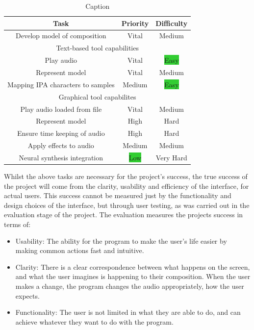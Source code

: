 \documentclass[12pt,a4paper,twoside,openright]{report}
\newcommand{\vital}{\colorbox{BrickRed}{Vital}}
\newcommand{\veryhard}{\colorbox{BrickRed}{Very Hard}}
\newcommand{\hard}{\colorbox{RedOrange}{Hard}}
\newcommand{\high}{\colorbox{RedOrange}{High}}
\newcommand{\medium}{\colorbox{Dandelion}{Medium}}
\newcommand{\low}{\colorbox{LimeGreen}{Low}}
\newcommand{\easy}{\colorbox{LimeGreen}{Easy}}
\begin{document}
\begin{table}[h]
    \centering
    \begin{tabular}{|c|c|c|}
        \hline
         Task & Priority & Difficulty \\
         \hline
         Develop model of composition & \vital & \medium \\
         \hline
         \multicolumn{3}{|c|}{Text-based tool capabilities} \\
         \hline
         Play audio & \vital & \easy \\
         Represent model & \vital & \medium \\
         Mapping IPA characters to samples & \medium & \easy \\
         \hline
         \multicolumn{3}{|c|}{Graphical tool capabilites} \\
         \hline
         Play audio loaded from file & \vital & \medium \\
         Represent model & \high & \hard \\
         Ensure time keeping of audio & \high & \hard \\
         Apply effects to audio & \medium & \medium \\
         Neural synthesis integration & \low & \veryhard \\
         \hline
    \end{tabular}
    \caption{Caption}
    \label{tab:req_anal}
\end{table}

Whilst the above tasks are necessary for the project's success, the true success of the project will come from the clarity, usability and efficiency of the interface, for actual users. This success cannot be measured just by the functionality and design choices of the interface, but through user testing, as was carried out in the evaluation stage of the project.  The evaluation measures the projects success in terms of:
\begin{itemize}
    \item Usability: The ability for the program to make the user's life easier by making common actions fast and intuitive.
    \item Clarity: There is a clear correspondence between what happens on the screen, and what the user imagines is happening to their composition. When the user makes a change, the program changes the audio appropriately, how the user expects.
    \item Functionality: The user is not limited in what they are able to do, and can achieve whatever they want to do with the program.
\end{itemize}
\end{document}
